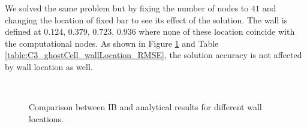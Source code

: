 We solved the same problem but by fixing the number of nodes to $41$ and changing the location of fixed bar to see its effect of the solution. The wall is defined at $0.124$, $0.379$, $0.723$, $0.936$ where none of these location coincide with the computational nodes. As shown in Figure \ref{fig:C3_ghostCell_wallLocation} and Table \ref{table:C3_ghostCell_wallLocation_RMSE}, the solution accuracy is not affected by wall location as well.

\begin{figure}[H]
	\centering
	\quad
	\\
	\quad
	\caption{Comparison between IB and analytical results for different wall locations.}
	\label{fig:C3_ghostCell_wallLocation}
\end{figure}

